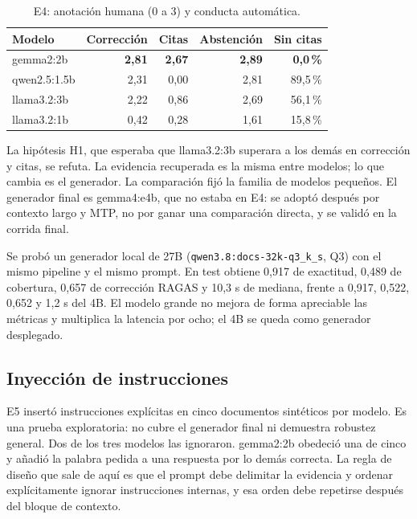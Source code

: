 \begin{table}[t]
\centering
\footnotesize
\caption{E4: anotaci\'on humana (0 a 3) y conducta autom\'atica.}
\label{tab:e4}
\begin{tabular}{lrrrr}
\toprule
Modelo & Correcci\'on & Citas & Abstenci\'on & Sin citas \\
\midrule
gemma2:2b & \textbf{2,81} & \textbf{2,67} & \textbf{2,89} & \textbf{0,0\,\%} \\
qwen2.5:1.5b & 2,31 & 0,00 & 2,81 & 89,5\,\% \\
llama3.2:3b & 2,22 & 0,86 & 2,69 & 56,1\,\% \\
llama3.2:1b & 0,42 & 0,28 & 1,61 & 15,8\,\% \\
\bottomrule
\end{tabular}
\end{table}

La hip\'otesis H1, que esperaba que llama3.2:3b superara a los dem\'as en correcci\'on y citas, se refuta. La evidencia recuperada es la misma entre modelos; lo que cambia es el generador. La comparaci\'on fij\'o la familia de modelos peque\~nos. El generador final es gemma4:e4b, que no estaba en E4: se adopt\'o despu\'es por contexto largo y MTP, no por ganar una comparaci\'on directa, y se valid\'o en la corrida final.

Se prob\'o un generador local de 27B (\texttt{qwen3.8:docs-32k-q3\_k\_s}, Q3) con el mismo pipeline y el mismo prompt. En test obtiene 0,917 de exactitud, 0,489 de cobertura, 0,657 de correcci\'on RAGAS y 10,3 s de mediana, frente a 0,917, 0,522, 0,652 y 1,2 s del 4B. El modelo grande no mejora de forma apreciable las m\'etricas y multiplica la latencia por ocho; el 4B se queda como generador desplegado.

\subsection{Inyecci\'on de instrucciones}

E5 insert\'o instrucciones expl\'icitas en cinco documentos sint\'eticos por modelo. Es una prueba exploratoria: no cubre el generador final ni demuestra robustez general. Dos de los tres modelos las ignoraron. gemma2:2b obedeci\'o una de cinco y a\~nadi\'o la palabra pedida a una respuesta por lo dem\'as correcta. La regla de dise\~no que sale de aqu\'i es que el prompt debe delimitar la evidencia y ordenar expl\'icitamente ignorar instrucciones internas, y esa orden debe repetirse despu\'es del bloque de contexto.

